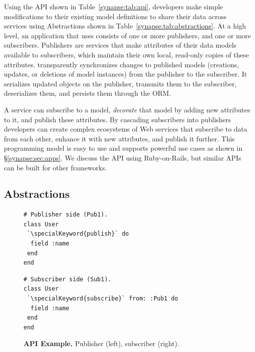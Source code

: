 Using the \synapse API shown in Table~\ref{synapse:tab:api}, developers make
simple modifications to their existing model definitions to share their data
across services using \synapse Abstractions shown in Table~\ref{synapse:tab:abstractions}.
At a high
level, an application that uses \synapse consists of one or more publishers,
and one or more subscribers. Publishers are services that make attributes of
their data models available to subscribers, which maintain their own local,
read-only copies of these attributes. \synapse transparently
synchronizes changes to published models (creations, updates, or deletions of
model instances) from the publisher to the subscriber.  It serializes
updated objects on the publisher, transmits them to the subscriber, deserializes
them, and persists them through the ORM.

A service can
subscribe to a model, \emph{decorate} that model by adding new
attributes to it, and publish these attributes. By cascading
subscribers into publishers developers can create complex
ecosystems of Web services that subscribe to data from each other, enhance it
with new attributes, and publish it further.  This
programming model is easy to use and supports powerful use
cases as shown in \S\ref{synapse:sec:apps}.
We discuss the \synapse API using Ruby-on-Rails, but similar APIs can be
built for other frameworks.


\subsection{\synapse Abstractions}
\label{synapse:sec:api}

\begin{figure}
\centering
\begin{minipage}{.8\textwidth}
\begin{minipage}{.4\textwidth}
\begin{rbox}
\begin{lstlisting}
# Publisher side (Pub1).
class User
 `\specialKeyword{publish}` do
  field :name
 end
end
\end{lstlisting}
\end{rbox}
\end{minipage}
\hspace{1.2in}
\begin{minipage}{.4\textwidth}
  \begin{rbox}
\begin{lstlisting}
# Subscriber side (Sub1).
class User
 `\specialKeyword{subscribe}` from: :Pub1 do
  field :name
 end
end
\end{lstlisting}
\end{rbox}
\end{minipage}
\end{minipage}
\caption{{\bf API Example.} Publisher (left), subscriber (right).}
\label{synapse:fig:pub-sub}
\end{figure}

